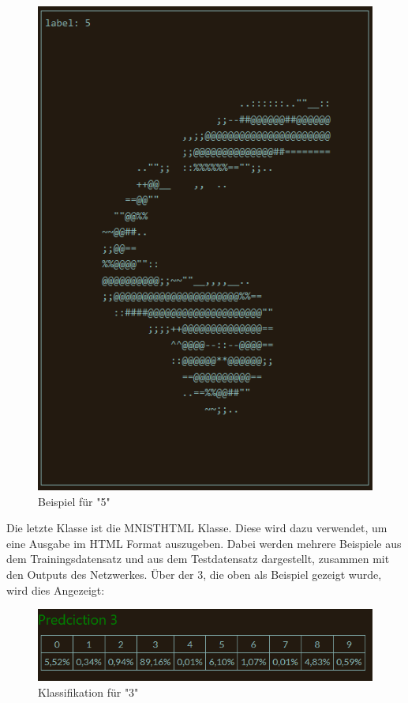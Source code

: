 \documentclass[12pt]{article}
\begin{document}
\begin{figure}[H]
\centering
\includegraphics[scale=0.60]{./Images/Pasted image 20231001133317.png}
\caption{Beispiel für "5"}
\label{Beispiel für "5"}
\end{figure}
Die letzte Klasse ist die MNISTHTML Klasse. Diese wird dazu verwendet, um eine Ausgabe im HTML Format auszugeben. Dabei werden mehrere Beispiele aus dem Trainingsdatensatz und aus dem Testdatensatz dargestellt, zusammen mit den Outputs des Netzwerkes.
Über der 3, die oben als Beispiel gezeigt wurde, wird dies Angezeigt:\begin{figure}[H]
\centering
\includegraphics[scale=0.60]{./Images/Pasted image 20231001133707.png}
\caption{Klassifikation für "3"}
\label{Klassifikation für "3"}
\end{figure}
\end{document}
